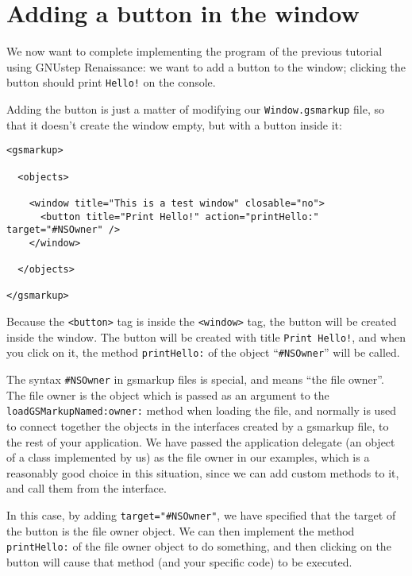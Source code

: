 \documentclass[a4paper]{article}
\begin{document}
\section{Adding a button in the window}
We now want to complete implementing the program of the previous
tutorial using GNUstep Renaissance: we want to add a button to the
window; clicking the button should print \texttt{Hello!} on the
console.

Adding the button is just a matter of modifying our
\texttt{Window.gsmarkup} file, so that it doesn't create the window
empty, but with a button inside it:
\begin{verbatim}
<gsmarkup>

  <objects>

    <window title="This is a test window" closable="no">
      <button title="Print Hello!" action="printHello:" target="#NSOwner" />
    </window>

  </objects>

</gsmarkup>
\end{verbatim}
Because the \texttt{<button>} tag is inside the \texttt{<window>} tag,
the button will be created inside the window.  The button will be
created with title \texttt{Print Hello!}, and when you click on it,
the method \texttt{printHello:} of the object ``\texttt{\#NSOwner}''
will be called.

The syntax \texttt{\#NSOwner} in gsmarkup files is special, and means
``the file owner''.  The file owner is the object which is passed as
an argument to the \texttt{loadGSMarkupNamed:owner:} method when
loading the file, and normally is used to connect together the objects
in the interfaces created by a gsmarkup file, to the rest of your
application.  We have passed the application delegate (an object of a
class implemented by us) as the file owner in our examples, which is a
reasonably good choice in this situation, since we can add custom
methods to it, and call them from the interface.

In this case, by adding \texttt{target="\#NSOwner"}, we have specified
that the target of the button is the file owner object.  We can then
implement the method \texttt{printHello:} of the file owner object to
do something, and then clicking on the button will cause that method
(and your specific code) to be executed.
\end{document}
